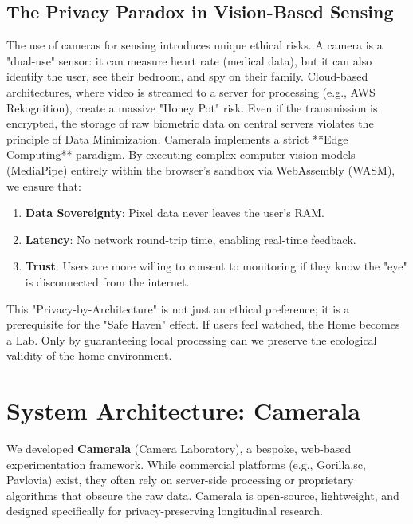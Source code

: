 \documentclass[journal]{IEEEtran}
\begin{document}
\subsection{The Privacy Paradox in Vision-Based Sensing}
The use of cameras for sensing introduces unique ethical risks. A camera is a "dual-use" sensor: it can measure heart rate (medical data), but it can also identify the user, see their bedroom, and spy on their family.
Cloud-based architectures, where video is streamed to a server for processing (e.g., AWS Rekognition), create a massive "Honey Pot" risk. Even if the transmission is encrypted, the storage of raw biometric data on central servers violates the principle of Data Minimization.
Camerala implements a strict **Edge Computing** paradigm. By executing complex computer vision models (MediaPipe) entirely within the browser's sandbox via WebAssembly (WASM), we ensure that:
\begin{enumerate}
    \item \textbf{Data Sovereignty}: Pixel data never leaves the user's RAM.
    \item \textbf{Latency}: No network round-trip time, enabling real-time feedback.
    \item \textbf{Trust}: Users are more willing to consent to monitoring if they know the "eye" is disconnected from the internet.
\end{enumerate}
This "Privacy-by-Architecture" is not just an ethical preference; it is a prerequisite for the "Safe Haven" effect. If users feel watched, the Home becomes a Lab. Only by guaranteeing local processing can we preserve the ecological validity of the home environment.

\section{System Architecture: Camerala}
We developed \textbf{Camerala} (Camera Laboratory), a bespoke, web-based experimentation framework. While commercial platforms (e.g., Gorilla.sc, Pavlovia) exist, they often rely on server-side processing or proprietary algorithms that obscure the raw data. Camerala is open-source, lightweight, and designed specifically for privacy-preserving longitudinal research.
\end{document}
